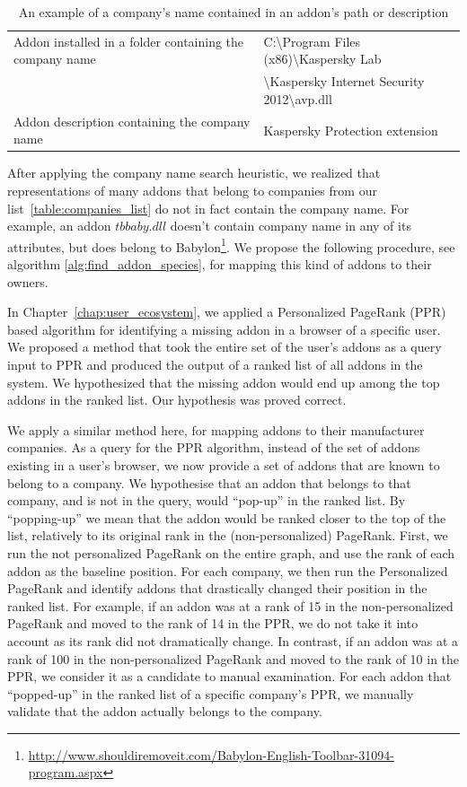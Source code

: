 \documentclass[11pt,oneside]{book}
\begin{document}
\begin{table}[h]
\centering
\caption{An example of a company's name contained in an addon's path or description}
\label{table:addon_desc}
\begin{tabular}{@{}|l|l|@{}}
\toprule
Addon installed in a folder containing the company name & C:\textbackslash{Program Files (x86)}\textbackslash{Kaspersky Lab}\\ & \textbackslash{Kaspersky Internet Security 2012}\textbackslash{avp.dll} \\ \midrule
Addon description containing the company name & Kaspersky Protection extension \\ \bottomrule
\end{tabular}
\end{table}

After applying the company name search heuristic, we realized that representations of many addons that belong to companies from our list~\autoref{table:companies_list} do not in fact contain the company name. For example, an addon $tbbaby.dll$ doesn't contain company name in any of its attributes, but does belong to Babylon\footnote{\url{http://www.shouldiremoveit.com/Babylon-English-Toolbar-31094-program.aspx}}. 
We propose the following procedure, see algorithm \autoref{alg:find_addon_species}, for mapping this kind of addons to their owners. 

In Chapter~\autoref{chap:user_ecosystem}, we applied a Personalized PageRank (PPR) based algorithm for identifying a missing addon in a browser of a specific user. We proposed a method that took the entire set of the user's addons as a query input to PPR and produced the output of a ranked list of all addons in the system. We hypothesized that the missing addon would end up among the top addons in the ranked list. Our hypothesis was proved correct.

We apply a similar method here, for mapping addons to their manufacturer companies. As a query for the PPR algorithm, instead of the set of addons existing in a user's browser, we now provide a set of addons that are known to belong to a company. We hypothesise that an addon that belongs to that company, and is not in the query, would ``pop-up'' in the ranked list. By ``popping-up'' we mean that the addon would be ranked closer to the top of the list, relatively to its original rank in the (non-personalized) PageRank. First, we run the not personalized PageRank on the entire graph, and use the rank of each addon as the baseline position. For each company, we then run the Personalized PageRank and identify addons that drastically changed their position in the ranked list. For example, if an addon was at a rank of 15 in the non-personalized PageRank and moved to the rank of 14 in the PPR, we do not take it into account as its rank did not dramatically change. In contrast, if an addon was at a rank of 100 in the non-personalized PageRank and moved to the rank of 10 in the PPR, we consider it as a candidate to manual examination. For each addon that ``popped-up'' in the ranked list of a specific company's PPR, we manually validate that the addon actually belongs to the company. 
\end{document}
